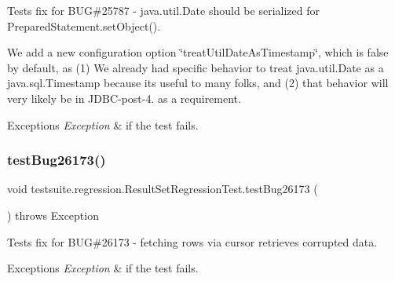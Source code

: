 Tests fix for B\+UG\#25787 -\/ java.\+util.\+Date should be serialized for Prepared\+Statement.\+set\+Object().

We add a new configuration option \char`\"{}treat\+Util\+Date\+As\+Timestamp\char`\"{}, which is false by default, as (1) We already had specific behavior to treat java.\+util.\+Date as a java.\+sql.\+Timestamp because it\textquotesingle{}s useful to many folks, and (2) that behavior will very likely be in J\+D\+B\+C-\/post-\/4. as a requirement.


\begin{DoxyExceptions}{Exceptions}
{\em Exception} & if the test fails. \\
\hline
\end{DoxyExceptions}
\mbox{\label{classtestsuite_1_1regression_1_1_result_set_regression_test_afa0bbccee8e4bffb0576ef3c0cd096f0}} 
\subsubsection{\texorpdfstring{test\+Bug26173()}{testBug26173()}}
{\footnotesize\ttfamily void testsuite.\+regression.\+Result\+Set\+Regression\+Test.\+test\+Bug26173 (\begin{DoxyParamCaption}{ }\end{DoxyParamCaption}) throws Exception}

Tests fix for B\+UG\#26173 -\/ fetching rows via cursor retrieves corrupted data.


\begin{DoxyExceptions}{Exceptions}
{\em Exception} & if the test fails. \\
\hline
\end{DoxyExceptions}
\mbox{\label{classtestsuite_1_1regression_1_1_result_set_regression_test_a5cf13074c3f54ef463c169be1423a3ba}} 
